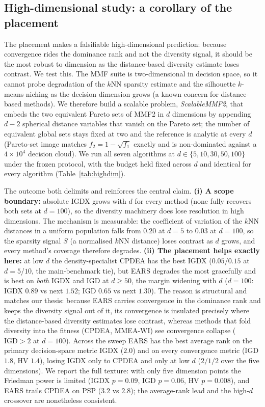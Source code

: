 

\subsection{High-dimensional study: a corollary of the placement}
\label{sec:highdim}
The placement makes a falsifiable high-dimensional prediction: because convergence rides the
dominance rank and not the diversity signal, it should be the most robust to dimension as the
distance-based diversity estimate loses contrast. We test this.
The MMF suite is two-dimensional in decision space, so it cannot probe degradation of the $k$NN
sparsity estimate and the silhouette $k$-means niching as the decision dimension grows
(a known concern for distance-based methods). We therefore build a scalable problem,
\emph{ScalableMMF2}, that embeds the two equivalent Pareto sets of MMF2 in $d$ dimensions by
appending $d{-}2$ spherical distance variables that vanish on the Pareto set; the number of
equivalent global sets stays fixed at two and the reference is analytic at every $d$ (Pareto-set
image matches $f_2{=}1{-}\sqrt{f_1}$ exactly and is non-dominated against a $4{\times}10^4$
decision cloud). We run all seven algorithms at $d\in\{5,10,30,50,100\}$ under the frozen
protocol, with the budget held fixed across $d$ and identical for every algorithm
(Table~\ref{tab:highdim}).

The outcome both delimits and reinforces the central claim. \textbf{(i) A scope boundary:}
absolute IGDX grows with $d$ for every method (none fully recovers both sets at $d{=}100$), so the
diversity machinery does lose resolution in high dimensions. The mechanism is measurable: the
coefficient of variation of the $k$NN distances in a uniform population falls from $0.20$ at
$d{=}5$ to $0.03$ at $d{=}100$, so the sparsity signal $S$ (a normalised $k$NN distance) loses
contrast as $d$ grows, and every method's coverage therefore degrades. \textbf{(ii) The placement helps
exactly here:} at low $d$ the density-specialist CPDEA has the best IGDX ($0.05$/$0.15$ at
$d{=}5$/$10$, the main-benchmark tie), but EARS degrades the most gracefully and is best on
\emph{both} IGDX and IGD at $d{\ge}50$, the margin widening with $d$ ($d{=}100$: IGDX $0.89$ vs
next $1.52$; IGD $0.65$ vs next $1.30$). The reason is structural and matches our thesis: because
EARS carries convergence in the dominance rank and keeps the diversity signal out of it, its
convergence is insulated precisely where the distance-based diversity estimates lose contrast,
whereas methods that fold diversity into the fitness (CPDEA, MMEA-WI) see convergence collapse
($\mathrm{IGD}{>}2$ at $d{=}100$). Across the sweep EARS has the best average rank on the primary
decision-space metric IGDX ($2.0$) and on every convergence metric (IGD $1.8$, HV $1.4$), losing
IGDX only to CPDEA and only at low $d$ ($2/1/2$ over the five dimensions). We report the full
texture: with only five dimension points the Friedman power is limited (IGDX $p{=}0.09$, IGD
$p{=}0.06$, HV $p{=}0.008$), and EARS trails CPDEA on PSP ($3.2$ vs $2.8$); the average-rank lead
and the high-$d$ crossover are nonetheless consistent.

